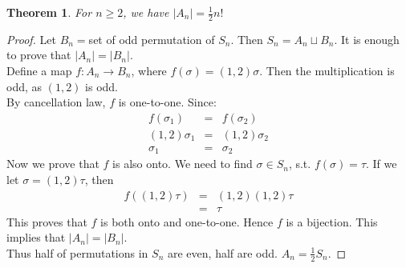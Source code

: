 \documentclass{article}
\theoremstyle{MyNonumberplain}
\theoremstyle{break}
\newtheorem*{proof}{Proof. }
\theoremstyle{break}
\newtheorem{theorem}{Theorem}[section]
\theoremstyle{break}
\theoremstyle{definition}
\theoremstyle{break}
\begin{document}
\begin{thmbox}
    \begin{theorem}
        For $n \geq 2$, we have $| A_n | = \frac{1}{2} n!$
    \end{theorem}
    \begin{prfbox}
        \begin{proof}
            Let $B_n =$set of odd permutation of $S_n$. Then $S_n = A_n  \sqcup B_n$. It
            is enough to prove that $| A_n | = | B_n |$.\\

            Define a map $f : A_n \rightarrow B_n$, where $f (\sigma) = (1, 2) \sigma$.
            Then the multiplication is odd, as $(1, 2)$ is odd.\\

            By cancellation law, $f$ is one-to-one. Since:
            \begin{eqnarray*}
            f (\sigma_1) & = & f (\sigma_2)\\
            (1, 2) \sigma_1 & = & (1, 2) \sigma_2\\
            \sigma_1 & = & \sigma_2
            \end{eqnarray*}
            Now we prove that $f$ is also onto. We need to find $\sigma \in S_n$, s.t. $f
            (\sigma) = \tau$. If we let $\sigma = (1, 2) \tau$, then
            \begin{eqnarray*}
            f ((1, 2) \tau) & = & (1, 2) (1, 2) \tau\\
            & = & \tau
            \end{eqnarray*}
            This proves that $f$ is both onto and one-to-one. Hence $f$ is a bijection.
            This implies that $| A_n | = | B_n |$.\\

            Thus half of permutations in $S_n$ are even, half are odd. $A_n = \frac{1}{2}
            S_n$.
        \end{proof}
    \end{prfbox}
\end{thmbox}
\end{document}
